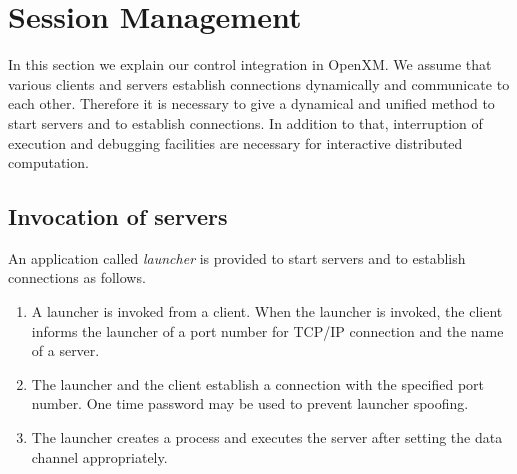 
\section{Session Management}
\label{secsession}
 
In this section we explain our control integration in
OpenXM.  We assume that various clients and servers
establish connections dynamically and communicate to each
other. Therefore it is necessary to give a dynamical and unified
method to start servers and to establish connections.
In addition to that, interruption of execution and 
debugging facilities
are necessary for interactive distributed computation.

%

\subsection{Invocation of servers}
\label{launcher}

An application called {\it launcher} is provided to start servers
and to establish connections as follows.

\begin{enumerate}
\item A launcher is invoked from a client.
When the launcher is invoked, the client 
informs the launcher of a port number for TCP/IP connection
and the name of a server.
\item The launcher and the client establish a connection with the
specified port number. One time password may be used to prevent
launcher spoofing.
\item The launcher creates a process and executes the server after
setting the data channel appropriately.
\end{enumerate}

